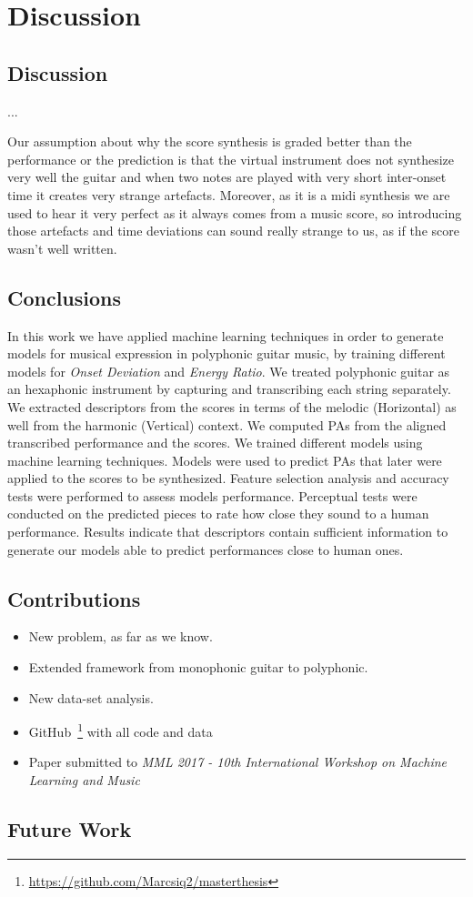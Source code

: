 \chapter{Discussion}
\label{chap:discussion}

\section{Discussion}
...

Our assumption about why the score synthesis is graded better than the performance or the prediction is that the virtual instrument does not synthesize very well the guitar and when two notes are played with very short inter-onset time it creates very strange artefacts. Moreover, as it is a midi synthesis we are used to hear it very perfect as it always comes from a music score, so introducing those artefacts and time deviations can sound really strange to us, as if the score wasn't well written.

\section{Conclusions}
In this work we have applied machine learning techniques in order to generate models for musical expression in polyphonic guitar music, by training different models for \textit{Onset Deviation} and \textit{Energy Ratio}. We treated polyphonic guitar as an hexaphonic instrument by capturing and transcribing each string separately. We extracted descriptors from the scores in terms of the melodic (Horizontal) as well from the harmonic (Vertical) context. We computed PAs from the aligned transcribed performance and the scores. We trained different models using machine learning techniques. Models were used to predict PAs that later were applied to the scores to be synthesized. Feature selection analysis and accuracy tests were performed to assess models performance. Perceptual tests were conducted on the predicted pieces to rate how close they sound to a human performance. Results indicate that descriptors contain sufficient information to generate our models able to predict performances close to  human ones.

\section{Contributions}
\begin{itemize}[noitemsep]
\item New problem, as far as we know.
\item Extended framework from monophonic guitar to polyphonic.
\item New data-set analysis.
\item GitHub~\footnote{\url{https://github.com/Marcsiq2/masterthesis}} with all code and data
\item Paper submitted to \textit{MML 2017 - 10th International Workshop on Machine Learning and Music}

\end{itemize}

\section{Future Work}

\cleardoublepage

